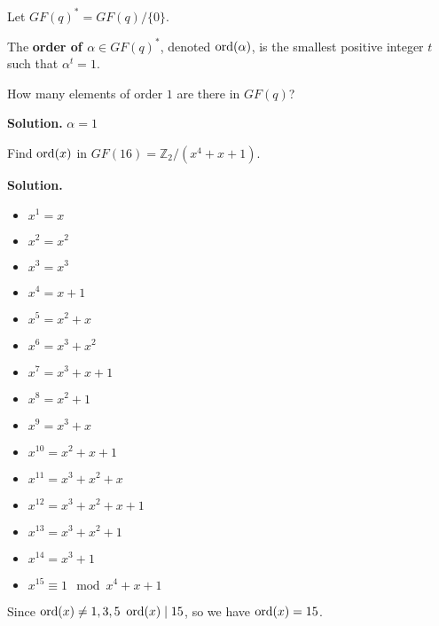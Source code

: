 \begin{defbox}
    \begin{definition}
        Let $ GF(q)^*=GF(q)/\{0\} $.
    \end{definition}
\end{defbox}

\begin{defbox}
    \begin{definition}
        The \textbf{order of $\alpha\in GF(q)^*$}, denoted
        $ \operatorname{ord}(\alpha) $, is the smallest positive integer $ t $ such that
        $ \alpha^t=1 $.
    \end{definition}
\end{defbox}

\begin{exbox}
    \begin{example}
        How many elements of order $ 1 $ are there in $ GF(q) $?

        \textbf{Solution.} $ \alpha=1 $
    \end{example}
\end{exbox}

\begin{exbox}
    \begin{example}
        Find $ \operatorname{ord}(x) $ in $ GF(16)=\mathbb{Z}_2/(x^4+x+1) $.

        \textbf{Solution.}
        \begin{itemize}
            \item $ x^1=x $
            \item $ x^2=x^2 $
            \item $ x^3=x^3 $
            \item $ x^4=x+1 $
            \item $ x^5=x^2+x $
            \item $ x^6=x^3+x^2 $
            \item $ x^7=x^3+x+1 $
            \item $ x^8=x^2+1 $
            \item $ x^9=x^3+x $
            \item $ x^{10}=x^2+x+1 $
            \item $ x^{11}=x^3+x^2+x $
            \item $ x^{12}=x^3+x^2+x+1 $
            \item $ x^{13}=x^3+x^2+1 $
            \item $ x^{14}=x^3+1 $
            \item $ x^{15}\equiv 1\mod x^4+x+1 $
        \end{itemize}
        Since $ \operatorname{ord}(x)\neq 1,3,5 $ $ \operatorname{ord}(x)\mid 15 $, so we have $ \operatorname{ord}(x)=15 $.
    \end{example}
\end{exbox}

